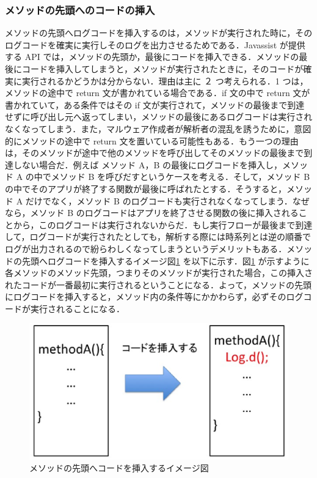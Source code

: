 \subsubsection{メソッドの先頭へのコードの挿入}
 \label{methodtop}
メソッドの先頭へログコードを挿入するのは，メソッドが実行された時に，そのログコードを確実に実行しそのログを出力させるためである．Javassist が提供する API では，メソッドの先頭か，最後にコードを挿入できる．メソッドの最後にコードを挿入してしまうと，メソッドが実行されたときに，そのコードが確実に実行されるかどうかは分からない．理由は主に ２ つ考えられる．1 つは，メソッドの途中で return 文が書かれている場合である．if 文の中で return 文が書かれていて，ある条件ではその if 文が実行されて，メソッドの最後まで到達せずに呼び出し元へ返ってしまい，メソッドの最後にあるログコードは実行されなくなってしまう．また，マルウェア作成者が解析者の混乱を誘うために，意図的にメソッドの途中で return 文を置いている可能性もある．もう一つの理由は，そのメソッドが途中で他のメソッドを呼び出してそのメソッドの最後まで到達しない場合だ．例えば メソッド A，B の最後にログコードを挿入し，メソッド A の中でメソッド B を呼びだすというケースを考える．そして，メソッド B の中でそのアプリが終了する関数が最後に呼ばれたとする．そうすると，メソッド A だけでなく，メソッド B のログコードも実行されなくなってしまう．なぜなら，メソッド B のログコードはアプリを終了させる関数の後に挿入されることから，このログコードは実行されないからだ．もし実行フローが最後まで到達して，ログコードが実行されたとしても，解析する際には時系列とは逆の順番でログが出力されるので紛らわしくなってしまうというデメリットもある．メソッドの先頭へログコードを挿入するイメージ図\ref{insertbefore} を以下に示す．図\ref{insertbefore} が示すように各メソッドのメソッド先頭，つまりそのメソッドが実行された場合，この挿入されたコードが一番最初に実行されるということになる．よって，メソッドの先頭にログコードを挿入すると，メソッド内の条件等にかかわらず，必ずそのログコードが実行されることになる．

\begin{figure}[t]
\begin{center}
\includegraphics[scale=0.3]{image2.eps}
\end{center}
\caption{メソッドの先頭へコードを挿入するイメージ図}
\label{insertbefore}
\end{figure}

